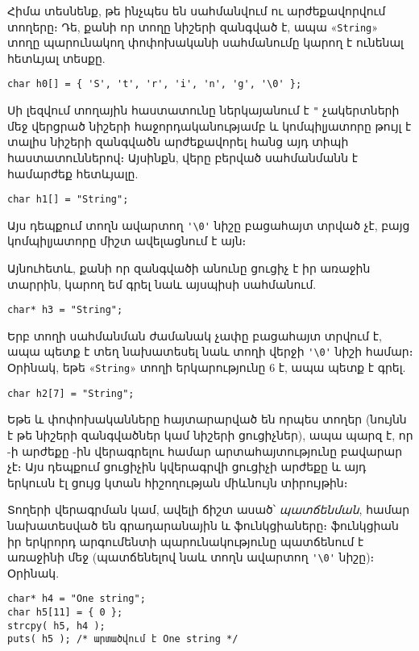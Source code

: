 Հիմա տեսնենք, թե ինչպես են սահմանվում ու արժեքավորվում տողերը։
Դե, քանի որ տողը նիշերի զանգված է, ապա «\texttt{String}» տողը
պարունակող  փոփոխականի սահմանումը կարող է ունենալ
հետևյալ տեսքը.

\begin{Verbatim}
char h0[] = { 'S', 't', 'r', 'i', 'n', 'g', '\0' };
\end{Verbatim}

Սի լեզվում տողային հաստատունը ներկայանում է \Verb|"| չակերտների
մեջ վերցրած նիշերի հաջորդականությամբ և կոմպիլյատորը թույլ է տալիս
նիշերի զանգվածն արժեքավորել հանց այդ տիպի հաստատուններով։ Այսինքն,
վերը բերված սահմանմանն է համարժեք հետևյալը.

\begin{Verbatim}
char h1[] = "String";
\end{Verbatim}

Այս դեպքում տողն ավարտող \Verb|'\0'| նիշը բացահայտ տրված չէ,
բայց կոմպիլյատորը միշտ ավելացնում է այն։

Այնուհետև, քանի որ զանգվածի անունը ցուցիչ է իր առաջին տարրին,
կարող եմ գրել նաև այսպիսի սահմանում.

\begin{Verbatim}
char* h3 = "String";
\end{Verbatim}

Երբ տողի սահմանման ժամանակ չափը բացահայտ տրվում է, ապա պետք է
տեղ նախատեսել նաև տողի վերջի \Verb|'\0'| նիշի համար։ Օրինակ,
եթե «\texttt{String}» տողի երկարությունը 6 է, ապա պետք է գրել.

\begin{Verbatim}
char h2[7] = "String";
\end{Verbatim}

Եթե  և  փոփոխականները հայտարարված են որպես
տողեր (նույնն է թե նիշերի զանգվածներ կամ նիշերի ցուցիչներ), ապա
պարզ է, որ -ի արժեքը -ին վերագրելու համար
 արտահայտությունը բավարար չէ։ Այս դեպքում 
ցուցիչին կվերագրվի  ցուցիչի արժեքը և այդ երկուսն էլ
ցույց կտան հիշողության միևնույն տիրույթին։

Տողերի վերագրման կամ, ավելի ճիշտ ասած՝ \emph{պատճենման}, համար
նախատեսված են գրադարանային  և 
ֆունկցիաները։  ֆունկցիան իր երկրորդ արգումենտի
պարունակությունը պատճենում է առաջինի մեջ (պատճենելով նաև տողն
ավարտող \Verb|'\0'| նիշը)։ Օրինակ.

\begin{Verbatim}
char* h4 = "One string";
char h5[11] = { 0 };
strcpy( h5, h4 );
puts( h5 ); /* արտածվում է One string */
\end{Verbatim}

